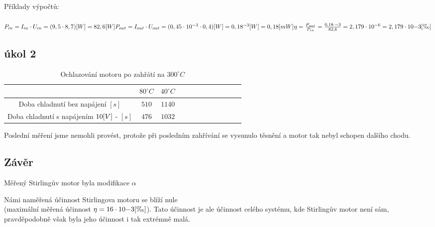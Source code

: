 \documentclass{article}
\begin{document}
\newpage

Příklady výpočtů: \\
\\
\large
\(
  P_{in} = I_{in} \cdot U_{in} = (9,5 \cdot 8,7)\-[W] = 82,6\-[W] \\ \\
  P_{out} = I_{out} \cdot U_{out} = (0,45\cdot 10^{-3} \cdot 0,4)\-[W] = 0,18^{-3}\-[W] = 0,18\-[mW] \\ \\
  \eta = \frac{P_{out}}{P_{in}} = \frac{0,18\cdot{-3}}{82,6} = 2,179\cdot10^{-6} = 2,179\cdot10{-3}\-[\text{\textperthousand}] \\ \\
\)
\large \\

\vspace{-10mm}
\subsection{úkol 2}
\begin{minipage}[t]{\textwidth}
  \begin{table}[H]
    \centering
    \begin{tabular}{|c|c|c|c|c|c|c|c|c|c|c|c|}
      \hline
                                                        & \(80^\circ C\)  & \(40^\circ C\)  \\ \hline
      Doba chladnutí bez napájení \([s]\)	              & \(510\)         & \(1140\)        \\ \hline
      Doba chladnutí s napájením \(10\-[V]\) - \([s]\)  & \(476\)         & \(1032\)        \\ \hline
    \end{tabular}
    \caption{\label{tabulka_mereni-5v} Ochlazování motoru po zahřátí na \(300^\circ C\)}
  \end{table}
\end{minipage}
Poslední měření jsme nemohli provést, protože při posledním zahřívání se vysunulo těsnění a motor tak nebyl schopen dalšího chodu.

\subsection{Závěr}
Měřený Stirlingův motor byla modifikace \(\alpha\)

Námi naměřená účinnost Stirlingova motoru se blíží nule \\ (maximální měřená účinnost \(\eta = 16\cdot10{-3}\-[\text{\textperthousand}]\)).
Tato účinnost je ale účinnost celého systému, kde Stirlingův motor není sám, pravděpodobně však byla jeho účinnost i tak extrémně malá.
\end{document}
